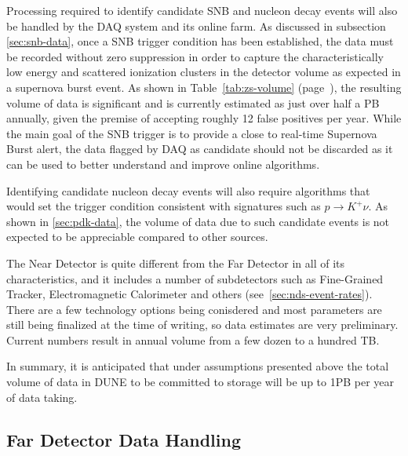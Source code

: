 Processing required to identify candidate SNB and nucleon decay events will also be handled by the DAQ system and its online farm.
As discussed in subsection \ref{sec:snb-data}, once a SNB trigger condition has been established, the data must
be recorded without zero suppression in order to capture the characteristically low energy and scattered ionization
clusters in the detector volume as expected in a supernova burst event. As shown in Table~\ref{tab:zs-volume} (page~\pageref{tab:zs-volume}),
the resulting volume of data is significant and is currently estimated as just over half a PB annually, given the premise of accepting roughly
12 false positives per year. While the main goal of the SNB trigger is to provide a close to real-time Supernova Burst alert, the data
flagged by DAQ as candidate should not be discarded as it can be used to better understand and improve online algorithms.

Identifying candidate nucleon decay events will also require algorithms that would set the trigger condition consistent
with signatures such as $p \rightarrow K^+\nu$. As shown in \ref{sec:pdk-data}, the volume of data due to such candidate
events is not expected to be appreciable compared to other sources.

The Near Detector is quite different from the Far Detector in all of its characteristics, and it includes a number of subdetectors
such as Fine-Grained Tracker, Electromagnetic Calorimeter and others (see~\ref{sec:nds-event-rates}). There are a few technology
options being conisdered and most parameters are still being finalized at the time of writing, so data estimates are very preliminary.
Current numbers result in annual volume from a few dozen to a hundred TB.

In summary, it is anticipated that under assumptions presented above the total volume of data in DUNE to be
committed to storage will be up to 1PB per year of data taking.

\subsection{Far Detector Data Handling}
